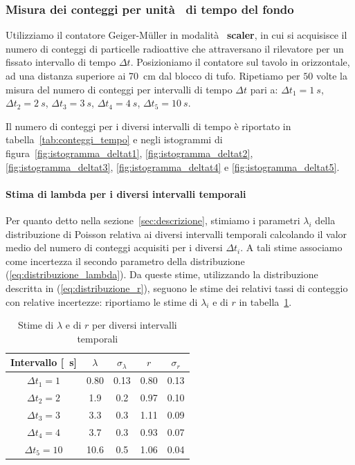 \documentclass[10pt,oneside,a4paper]{article}
\begin{document}
\subsubsection{Misura dei conteggi per unità  di tempo del fondo}
Utilizziamo il contatore Geiger-M\"uller in modalità  \textbf{scaler}, in cui si acquisisce il numero di conteggi di particelle radioattive che attraversano il rilevatore per un fissato intervallo di tempo $\Delta t$. Posizioniamo il contatore sul tavolo in orizzontale, ad una distanza superiore ai \SI{70}{cm} dal blocco di tufo. Ripetiamo per $50$ volte la misura del numero di conteggi per intervalli di tempo $\Delta t$ pari a: $\Delta t_1 = \SI{1}{s}$, $\Delta t_2 = \SI{2}{s}$, $\Delta t_3 = \SI{3}{s}$, $\Delta t_4 = \SI{4}{s}$, $\Delta t_5 = \SI{10}{s}$.

Il numero di conteggi per i diversi intervalli di tempo è riportato in tabella~\ref{tab:conteggi_tempo} e negli istogrammi di figura~\ref{fig:istogramma_deltat1}, \ref{fig:istogramma_deltat2}, \ref{fig:istogramma_deltat3}, \ref{fig:istogramma_deltat4} e \ref{fig:istogramma_deltat5}.
\paragraph{Stima di lambda per i diversi intervalli temporali}
Per quanto detto nella sezione~\ref{sec:descrizione}, stimiamo i parametri $\lambda_i$ della distribuzione di Poisson relativa ai diversi intervalli temporali calcolando il valor medio del numero di conteggi acquisiti per i diversi $\Delta t_i$. A tali stime associamo come incertezza il secondo parametro della distribuzione (\ref{eq:distribuzione_lambda}). Da queste stime, utilizzando la distribuzione descritta in (\ref{eq:distribuzione_r}), seguono le stime dei relativi tassi di conteggio con relative incertezze: riportiamo le stime di $\lambda_i$  e di $r$ in tabella~\ref{tab:lambda_r_conteggi}.
\begin{table}[ht]
\caption{Stime di $\lambda$ e di $r$ per diversi intervalli temporali}
\label{tab:lambda_r_conteggi}
\centering
\begin{tabular}{c|cc|cc}
\toprule
Intervallo [\SI{}{s}] & $\lambda$ & $\sigma_{\lambda}$ & $r$ & $\sigma_{r}$ \\
\hline 
$\Delta t_1 = 1$ & 0.80  & 0.13 & 0.80 & 0.13\\ 
$\Delta t_2 = 2$ & 1.9  & 0.2 & 0.97 & 0.10\\
$\Delta t_3 = 3$ & 3.3  & 0.3  & 1.11 & 0.09\\
$\Delta t_4 = 4$ & 3.7  & 0.3 & 0.93 & 0.07\\
$\Delta t_5 = 10$ & 10.6 & 0.5 & 1.06 & 0.04\\
\bottomrule
\end{tabular}
\end{table}
\end{document}
